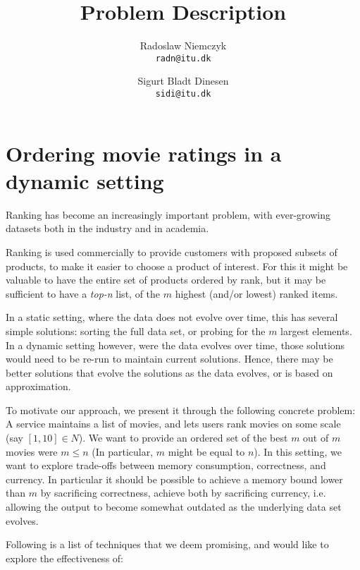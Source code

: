\documentclass[a4paper, titlepage]{report}
\renewcommand{\%}{\scalebox{.9}{\oldpct}}
\begin{document}
\title{Problem Description}
\author{
	Radoslaw Niemczyk
	\\\texttt{radn@itu.dk}
	\and
	Sigurt Bladt Dinesen
	\\\texttt{sidi@itu.dk}
}

\maketitle


\section*{Ordering movie ratings in a dynamic setting}
Ranking has become an increasingly important problem, with ever-growing datasets
both in the industry and in academia.

Ranking is used commercially to provide customers with proposed subsets of
products, to make it easier to choose a product of interest. For this it might
be valuable to have the entire set of products ordered by rank, but it may be
sufficient to have a \textit{top-n} list, of the $m$ highest (and/or lowest)
ranked items.

In a static setting, where the data does not evolve over time, this has several
simple solutions: sorting the full data set, or probing for the $m$ largest
elements. In a dynamic setting however, were the data evolves over time, those
solutions would need to be re-run to maintain current solutions. Hence, there
may be better solutions that evolve the solutions as the data evolves, or is
based on approximation.

To motivate our approach, we present it through the following concrete problem:
A service maintains a list of movies, and lets users rank movies on some scale
(say $[1,10]\in N$). We want to provide an ordered set of the best $m$ out of
$m$ movies were $m\leq n$ (In particular, $m$ might be equal to $n$).
In this setting, we want to explore trade-offs between memory consumption,
correctness, and  currency. In particular it should be possible to achieve a
memory bound lower than $m$ by sacrificing correctness, achieve both by
sacrificing currency, i.e. allowing the output to become somewhat outdated as
the underlying data set evolves.

Following is a list of techniques that we deem promising, and would like to
explore the effectiveness of:
\end{document}

